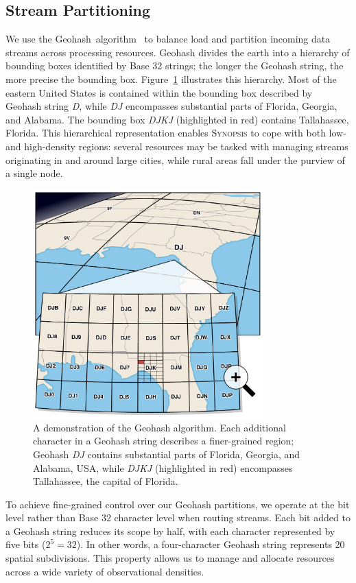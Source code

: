 \subsection{Stream Partitioning}
We use the Geohash~algorithm~\cite{geohash} to balance load and partition incoming data streams across processing resources. Geohash divides the earth into a hierarchy of bounding boxes identified by Base 32 strings; the longer the Geohash string, the more precise the bounding box. Figure~\ref{fig:geohash} illustrates this hierarchy. Most of the eastern United States is contained within the bounding box described by Geohash string \emph{D}, while \emph{DJ} encompasses substantial parts of Florida, Georgia, and Alabama. The bounding box \emph{DJKJ} (highlighted in red) contains Tallahassee, Florida. This hierarchical representation enables \textsc{Synopsis} to cope with both low- and high-density regions: several resources may be tasked with managing streams originating in and around large cities, while rural areas fall under the purview of a single node.

\begin{figure}[b!]
    \centerline{\includegraphics[width=3.5in]{figures/geohash.pdf}}
    \caption{A demonstration of the Geohash algorithm. Each additional character in a Geohash string describes a finer-grained region; Geohash \emph{DJ} contains substantial parts of Florida, Georgia, and Alabama, USA, while \emph{DJKJ} (highlighted in red) encompasses Tallahassee, the capital of Florida.}
    \label{fig:geohash}
\end{figure}

To achieve fine-grained control over our Geohash partitions, we operate at the bit level rather than Base 32 character level when routing streams. Each bit added to a Geohash string reduces its scope by half, with each character represented by five bits ($2^5 = 32$). In other words, a four-character Geohash string represents 20 spatial subdivisions. This property allows us to manage and allocate resources across a wide variety of observational densities.

